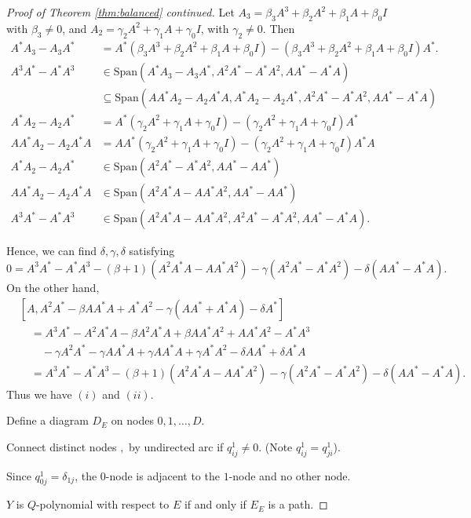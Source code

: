 \documentclass[
]{book}
\theoremstyle{definition}
\theoremstyle{definition}
\theoremstyle{definition}
\theoremstyle{definition}
\theoremstyle{remark}
\begin{document}
\begin{proof}[Proof of Theorem \ref{thm:balanced} continued]
Let \(A_3 = \beta_3A^3 + \beta_2 A^2 + \beta_1 A + \beta_0 I\) with \(\beta_3\neq 0\), and \(A_2 = \gamma_2 A^2 + \gamma_1 A + \gamma_0 I\), with \(\gamma_2\neq 0\). Then
\begin{align}
A^*A_3-A_3A^* & = A^*(\beta_3 A^3 + \beta_2 A^2 + \beta_1 A + \beta_0 I) - (\beta_3 A^3 + \beta_2 A^2 + \beta_1 A + \beta_0 I)A^*.\\
A^3A^*-A^*A^3 & \in \mathrm{Span}(A^*A_3 - A_3A^*, A^2A^* - A^*A^2, AA^*-A^*A)\\
& \subseteq \mathrm{Span}(AA^*A_2 - A_2A^*A, A^*A_2-A_2A^*, A^2A^*-A^*A^2, AA^*-A^*A)\\
A^*A_2 - A_2A^* & = A^*(\gamma_2 A^2 + \gamma_1 A + \gamma_0 I) - (\gamma_2 A^2 + \gamma_1 A + \gamma_0 I)A^*\\
AA^*A_2 - A_2A^*A & = AA^*(\gamma_2 A^2 + \gamma_1 A + \gamma_0 I) - (\gamma_2 A^2 + \gamma_1 A + \gamma_0 I)A^*A\\
A^*A_2 - A_2A^* & \in \mathrm{Span}(A^2A^*-A^*A^2, AA^*-AA^*)\\
AA^*A_2 - A_2A^*A & \in \mathrm{Span}(A^2A^*A-AA^*A^2, AA^*-AA^*)\\
A^3A^*-A^*A^3 & \in \mathrm{Span}(A^2A^*A-AA^*A^2, A^2A^*-A^*A^2, AA^*-A^*A).
\end{align}

Hence, we can find \(\delta, \gamma, \delta\) satisfying
\[0 = A^3A^*-A^*A^3 - (\beta+1)(A^2A^*A-AA^*A^2)-\gamma(A^2A^*-A^*A^2)-\delta(AA^*-A^*A).\]
On the other hand,
\begin{align}
& [A, A^2A^*-\beta AA^*A+A^*A^2-\gamma(AA^*+A^*A)-\delta A^*]\\
& \quad = A^3A^*-A^2A^*A-\beta A^2A^*A + \beta AA^*A^2 + AA^*A^2 - A^*A^3 \\
& \quad\quad - \gamma A^2A^* - \gamma AA^*A + \gamma AA^*A + \gamma A^*A^2 - \delta AA^* + \delta A^*A\\
& \quad = A^3A^* - A^*A^3 - (\beta+1)(A^2A^*A-AA^*A^2)-\gamma(A^2A^*-A^*A^2)-\delta (AA^*-A^*A).
\end{align}
Thus we have \((i)\) and \((ii)\).

Define a diagram \(D_E\) on nodes \(0, 1, \ldots, D\).

Connect distinct nodes \(,\) by undirected arc if \(q^1_{ij}\neq 0\). (Note \(q^1_{ij} = q^1_{ji}\)).

Since \(q^1_{0j} = \delta_{1j}\), the \(0\)-node is adjacent to the \(1\)-node and no other node.

\(Y\) is \(Q\)-polynomial with respect to \(E\) if and only if \(E_E\) is a path.


\end{proof}
\end{document}
